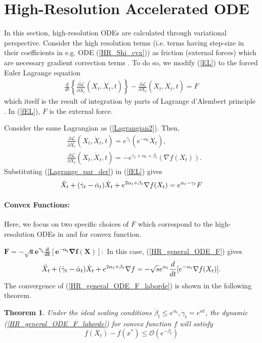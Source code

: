 \documentclass{article}
\theoremstyle{plain}
\newtheorem{thm}{\textbf{Theorem}}
\theoremstyle{definition}
\theoremstyle{remark}
\begin{document}
\section{High-Resolution Accelerated ODE}\label{sec_HR_ODE}
In this section, high-resolution ODEs are calculated through variational perspective. Consider the high resolution terms (i.e. terms having step-size in their coefficients in e.g. ODE (\ref{HR_Shi_cvx})) as friction (external forces) which are necessary gradient correction terms \cite{Shi2021UnderstandingTA}. To do so, we modify (\ref{EL}) to the forced Euler Lagrange equation
\begin{align}\label{fEL}
        \frac{d}{dt}\left\{  \frac{\partial \mathcal{L}}{\partial \dot{X}_t}(X_t,\dot{X}_t,t)  \right\}-\frac{\partial \mathcal{L}}{\partial X_t}(X_t,\dot{X}_t,t)=F 
\end{align}
which itself is the result of integration by parts of Lagrange d'Alembert principle \cite{campos2021discrete}. In (\ref{fEL}), $F$ is the external force.\par 
Consider the same Lagrangian as (\ref{Lagrangian2}). Then,
\begin{align}\label{Lagrange_par_der}
  &   \frac{\partial \mathcal{L}}{\partial \dot{X}_t}(X_t,\dot{X}_t,t)  =e^{\gamma_t}(e^{-\alpha_t}\dot{X}_t),\nonumber\\
  & \frac{\partial \mathcal{L}}{\partial X_t}(X_t,\dot{X}_t,t)= -e^{\gamma_t+\alpha_t+\beta_t}(\nabla f(X_t)).
\end{align}
Substituting (\ref{Lagrange_par_der}) in (\ref{fEL}) gives
\begin{align}\label{HR_general_ODE_F}
    \Ddot{X}_t + (\dot{\gamma}_t-\dot{\alpha}_t)\dot{X}_t+e^{2\alpha_t+\beta_t}\nabla f(X_t) =e^{\alpha_t-\gamma_t} F
\end{align}
\paragraph{Convex Functions:} Here, we focus on two specific choices of $F$ which correspond to the high-resolution ODEs in \cite{pmlr-v108-laborde20a} and \cite{shi2019acceleration} for convex function.

$\boldsymbol {F = -\sqrt{s}e^{\gamma_t}\frac{d}{dt}[e^{-\alpha_t}\nabla f(X)]}:$ 
    In this case, (\ref{HR_general_ODE_F}) gives
    \begin{align}\label{HR_general_ODE_F_laborde}
    \Ddot{X}_t + (\dot{\gamma}_t-\dot{\alpha}_t)\dot{X}_t+e^{2\alpha_t+\beta_t}\nabla f = -\sqrt{s}e^{\alpha_t}\frac{d}{dt}[e^{-\alpha_t}\nabla f(X_t)].
\end{align}
The convergence of (\ref{HR_general_ODE_F_laborde}) is shown in the following theorem.
\begin{thm}\label{Theorem_ODE_laborde}
Under the ideal scaling conditions $\dot\beta_t\leq e^{\alpha_t}, \dot\gamma_t=e^{\alpha t}$, the dynamic (\ref{HR_general_ODE_F_laborde}) for convex function $f$ will satisfy 
$$f(X_t)-f(x^*)\leq \mathcal{O}(e^{-\beta_t})$$
\end{thm}
\end{document}
